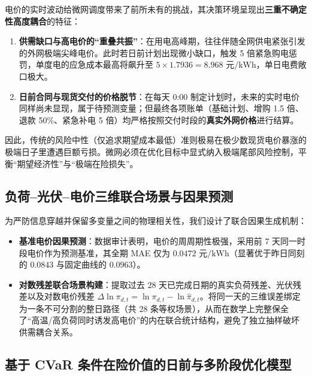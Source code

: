 \documentclass[withoutpreface]{cumcmthesis}
\begin{document}
电价的实时波动给微网调度带来了前所未有的挑战，其决策环境呈现出\textbf{三重不确定性高度耦合}的特征：
\begin{enumerate}
    \item \textbf{供需缺口与高电价的“重叠共振”}：在用电高峰期，往往伴随全网供电紧张引发的外网极端尖峰电价。此时若日前计划出现微小缺口，触发 5 倍紧急购电惩罚，单度电的应急成本最高将飙升至 $5 \times 1.7936 = 8.968\text{ 元/kWh}$，单日电费敞口极大。
    \item \textbf{日前合同与现货交付的价格脱节}：在每天 0:00 制定计划时，未来的实时电价同样尚未显现，属于待预测变量；但最终各项账单（基础计划、增购 1.5 倍、退款 50\%、紧急补电 5 倍）均严格按照交付时段的\textbf{真实外网价格}进行结算。
\end{enumerate}
因此，传统的风险中性（仅追求期望成本最低）准则极易在极少数现货电价暴涨的极端日子里遭遇巨额亏损。微网必须在优化目标中显式纳入极端尾部风险控制，平衡“期望经济性”与“极端在险损失”。

\subsection{负荷--光伏--电价三维联合场景与因果预测}
为严防信息穿越并保留多变量之间的物理相关性，我们设计了联合因果生成机制：
\begin{itemize}
    \item \textbf{基准电价因果预测}：数据审计表明，电价的周周期性极强，采用前 7 天同一时段电价作为预测基准，其全期 MAE 仅为 $0.0472\text{ 元/kWh}$（显著优于昨日同刻的 $0.0843$ 与固定曲线的 $0.0963$）。
    \item \textbf{对数残差联合场景构建}：提取过去 28 天已完成日期的真实负荷残差、光伏残差以及对数电价残差 $\Delta \ln \pi_{d,t} = \ln \pi_{d,t} - \ln \widehat{\pi}_{d,t}$。将同一天的三维误差绑定为一条不可分割的整日路径（共 28 条等权场景），从而在数学上完整保全了“高温/高负荷同时诱发高电价”的内在联合统计结构，避免了独立抽样破坏供需耦合关系。
\end{itemize}

\subsection{基于 CVaR 条件在险价值的日前与多阶段优化模型}
\end{document}
